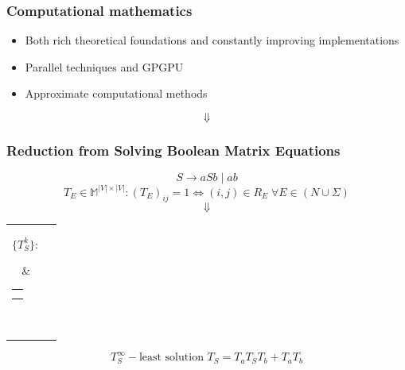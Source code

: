 \documentclass[aspectratio=169,xcolor=table]{beamer}
\begin{document}
\begin{frame}[fragile]
  \transwipe[direction=90]
  \frametitle{Computational mathematics}
\begin{itemize}
  \item Both rich theoretical foundations and constantly improving implementations
  \item Parallel techniques and GPGPU
  \item Approximate computational methods
\end{itemize}
\pause
    \vspace{5pt}
    \color{red} {$$\Downarrow$$}
    \large\centering\color{red}{Acceleration of CFPQs processing}
   
\end{frame}


\begin{frame}[fragile]
  \transwipe[direction=90]
  \frametitle{Reduction from Solving Boolean Matrix Equations}
  
  $$S \rightarrow aSb \mid ab$$
  $$T_E \in \mathbb{M}^{|V| \times |V|}: (T_{E})_{ij} = 1 \iff (i,j) \in R_E \; \forall E \in (N \cup \Sigma)$$
  \pause
  $$\Downarrow$$
    \centering
    \begin{tabular}{cl}
    \parbox{0.07\linewidth}{
    $$\{ T_S^k \}:$$
    }
    & \begin{tabular}{l}
    $T_S^0 = \mathbf{0}$ \\
    $T_S^{k+1} = T_a T_S^k T_b + T_a T_b$
    \end{tabular} \\
    \end{tabular}

  $$T_S^{\infty} - \text{least solution } T_S = T_aT_ST_b + T_aT_b$$

\end{frame}
\end{document}
